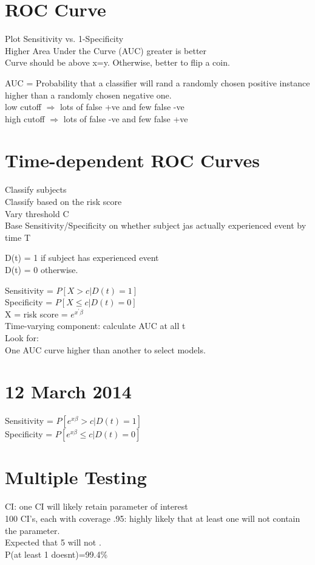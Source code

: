\documentclass{article}                                                   %
\def\wl{\par \vspace{\baselineskip}}                                      %
\begin{document}
  \section{ROC Curve}
  Plot Sensitivity vs. 1-Specificity \\
  Higher Area Under the Curve (AUC) greater is better \\
  Curve should be above x=y. Otherwise, better to flip a coin. \\
  \wl\noindent
  AUC = Probability that a classifier will rand a randomly chosen
  positive instance higher than a randomly chosen negative one. \\

  \noindent
  low  cutoff $\Rightarrow$ lots of false +ve and few false -ve \\
  high cutoff $\Rightarrow$ lots of false -ve and few false +ve \\

  \section{Time-dependent ROC Curves}
  Classify subjects\\
  Classify based on the risk score\\
  Vary threshold C\\
  Base Sensitivity/Specificity on whether subject
  jas actually experienced event by time T\\
  \wl\noindent
  D(t) = 1 if subject has experienced event\\
  D(t) = 0 otherwise.\\
  \wl\noindent
  Sensitivity = $P[X>c|D(t)=1]$\\
  Specificity = $P[X\le c|D(t)=0]$\\
  X = risk score = $e^{x^\prime\beta}$\\
  Time-varying component: calculate AUC at all t\\
  Look for:\\
  One AUC curve higher than another to select models.\\

  \section{12 March 2014}
  Sensitivity = $P[e^{x\beta}>c|D(t)=1]$\\
  Specificity = $P[e^{x\beta}\le c|D(t)=0]$\\
  
  \section{Multiple Testing}
  CI: one CI will likely retain parameter of interest\\
  100 CI's, each with coverage .95: highly likely that
  at least one will not contain the parameter.\\
  Expected that 5 will not .\\
  P(at least 1 doesnt)=99.4\%\\
\end{document}
